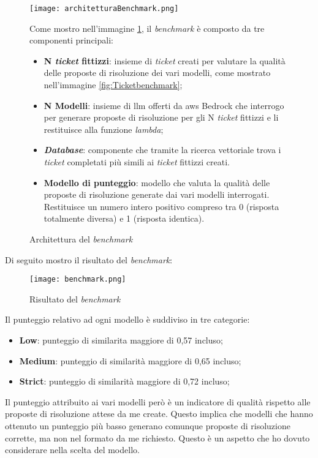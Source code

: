 \begin{figure}[H]
    \centering
    \texttt{[image: architetturaBenchmark.png]}
    \caption{Architettura del \textit{benchmark}}
    \label{fig:benchmarkArchitecture}
\noindent
Come mostro nell'immagine \ref{fig:benchmarkArchitecture}, il \textit{benchmark} è composto da tre componenti principali:
\begin{itemize}
    \item \textbf{N \textit{ticket} fittizzi}: insieme di \textit{ticket} creati per valutare la qualità delle proposte di risoluzione dei vari modelli, come mostrato nell'immagine \ref{fig:Ticketbenchmark};
    \item \textbf{N Modelli}: insieme di \gls{llm} offerti da \gls{aws} Bedrock che interrogo per generare proposte di risoluzione per gli N \textit{ticket} fittizzi e li restituisce alla funzione \textit{lambda}; 
    \item \textbf{\textit{Database}}: componente che tramite la ricerca vettoriale trova i \textit{ticket} completati più simili ai \textit{ticket} fittizzi creati. 
    \item \textbf{Modello di punteggio}: modello che valuta la qualità delle proposte di risoluzione generate dai vari modelli interrogati. Restituisce un numero intero positivo compreso tra 0 (risposta totalmente diversa) e 1 (risposta identica).
\end{itemize}
\end{figure}
Di seguito mostro il risultato del \textit{benchmark}:
\begin{figure}[H]
    \centering
    \texttt{[image: benchmark.png]}
    \caption{Risultato del \textit{benchmark}}
    \label{fig:benchmarkResult}
\end{figure}
\noindent
Il punteggio relativo ad ogni modello è suddiviso in tre categorie:
\begin{itemize}
    \item \textbf{Low}: punteggio di similarita maggiore di 0,57 incluso;
    \item \textbf{Medium}: punteggio di similarità maggiore di 0,65 incluso;
    \item \textbf{Strict}: punteggio di similarità maggiore di 0,72 incluso;
\end{itemize}
Il punteggio attribuito ai vari modelli però è un indicatore di qualità rispetto alle proposte di risoluzione attese da me create. Questo implica che modelli che hanno ottenuto un punteggio più basso generano comunque proposte di risoluzione corrette, ma non nel formato da me richiesto. Questo è un aspetto che ho dovuto considerare nella scelta del modello.
